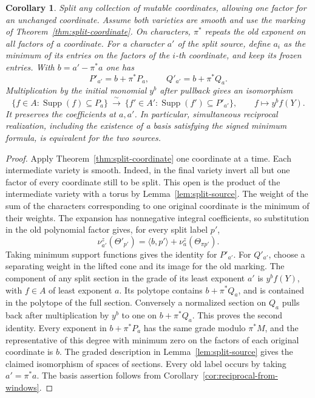 \documentclass[11pt,reqno]{amsart}
\numberwithin{equation}{section}
\newtheorem{corollary}[theorem]{Corollary}
\theoremstyle{definition}
\theoremstyle{remark}
\DeclareMathOperator{\Supp}{Supp}
\begin{document}
\begin{corollary}\label{cor:split-reciprocal-windows}
Split any collection of mutable coordinates, allowing one factor for an
unchanged coordinate. Assume both varieties are smooth and use the
marking of Theorem~\ref{thm:split-coordinate}. On characters,
\(\pi^*\) repeats the old exponent on all factors of a coordinate.
For a character \(a'\) of the split source, define \(a_i\) as the
minimum of its entries on the factors of the \(i\)-th coordinate,
and keep its frozen entries. With \(b=a'-\pi^*a\) one has
\[ P'_{a'}=b+\pi^*P_a,\qquad Q'_{a'}=b+\pi^*Q_a. \]
Multiplication by the initial monomial \(y^b\) after pullback gives
an isomorphism
\[ \{f\in A:\Supp(f)\subseteq P_a\} \ \xrightarrow{\ \sim\ }\ \{f'\in A':\Supp(f')\subseteq P'_{a'}\},\qquad f\longmapsto y^b f(Y). \]
It preserves the coefficients at \(a,a'\). In particular, simultaneous
reciprocal realization, including the existence of a basis satisfying
the signed minimum formula, is equivalent for the two sources.
\end{corollary}
\begin{proof}
Apply Theorem~\ref{thm:split-coordinate} one coordinate at a time.
Each intermediate variety is smooth. Indeed, in the final variety invert
all but one factor of every coordinate still to be split. This open
is the product of the intermediate variety with a torus by Lemma~\ref{lem:split-source}.
The weight of the sum of the characters corresponding to one
original coordinate is the minimum of their weights. The expansion has nonnegative
integral coefficients, so substitution in the old polynomial factor
gives, for every split label \(p'\),
\[ \nu^z_{a'}(\Theta'_{p'}) =\langle b,p'\rangle+\nu^z_a(\Theta_{\pi p'}). \]
Taking minimum support functions gives the identity for \(P'_{a'}\).
For \(Q'_{a'}\), choose a separating weight in the lifted cone and
its image for the old marking. The component of any split section
in the grade of its least exponent \(a'\) is \(y^b f(Y)\), with
\(f\in A\) of least exponent \(a\). Its polytope contains
\(b+\pi^*Q_a\), and is contained in the polytope of the full section.
Conversely a normalized section on \(Q_a\) pulls back after multiplication
by \(y^b\) to one on \(b+\pi^*Q_a\). This proves the second identity.
Every exponent
in \(b+\pi^*P_a\) has the same grade modulo \(\pi^*M\), and the
representative of this degree with minimum zero on the factors of each original coordinate is \(b\). The graded description
in Lemma~\ref{lem:split-source} gives the claimed isomorphism of spaces of sections.
Every old label occurs by taking \(a'=\pi^*a\). The basis assertion
follows from Corollary~\ref{cor:reciprocal-from-windows}.
\end{proof}
\end{document}
